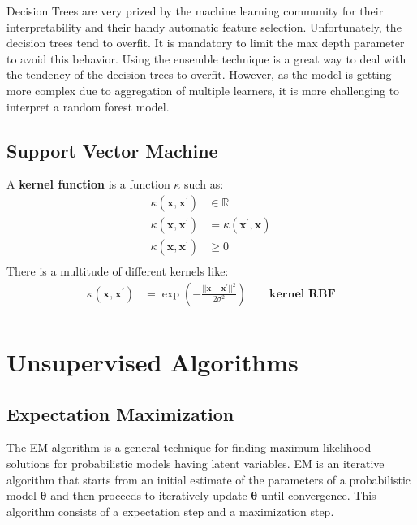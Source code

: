 \documentclass[12pt]{report}
\begin{document}
            Decision Trees are very prized by the machine learning community for their interpretability and their handy automatic feature selection. Unfortunately, the decision trees tend to overfit. It is mandatory to limit the max depth parameter to avoid this behavior. Using the ensemble technique is a great way to deal with the tendency of the decision trees to overfit. However, as the model is getting more complex due to aggregation of multiple learners, it is more challenging to interpret a random forest model.
            
    \subsection{Support Vector Machine}
        A \textbf{kernel function} is a function $\kappa$ such as:
        \begin{align}
            \kappa(\boldsymbol{x}, \boldsymbol{x^{'}}) &\in \mathbb{R} \\
            \kappa(\boldsymbol{x}, \boldsymbol{x}^{'}) &= \kappa(\boldsymbol{x}^{'}, \boldsymbol{x}) \\
            \kappa(\boldsymbol{x}, \boldsymbol{x^{'}}) &\geq 0 \\
        \end{align}
        There is a multitude of different kernels like:
        \begin{align}
            \kappa(\boldsymbol{x}, \boldsymbol{x^{'}}) &= \exp\left(-\frac{|| \boldsymbol{x} -  \boldsymbol{x^{'}} ||^2}{2\sigma^{2}}\right) \qquad \textbf{kernel RBF} \\
        \end{align}
            
    \section{Unsupervised Algorithms}
        \subsection{Expectation Maximization}
            The EM algorithm is a general technique for finding maximum likelihood solutions for probabilistic models having latent variables. EM is an iterative algorithm that starts from an initial estimate of the parameters of a probabilistic model $\boldsymbol{\theta}$ and then proceeds to iteratively update $\boldsymbol{\theta}$ until convergence. This algorithm consists of a expectation step and a maximization step.
            
\end{document}
